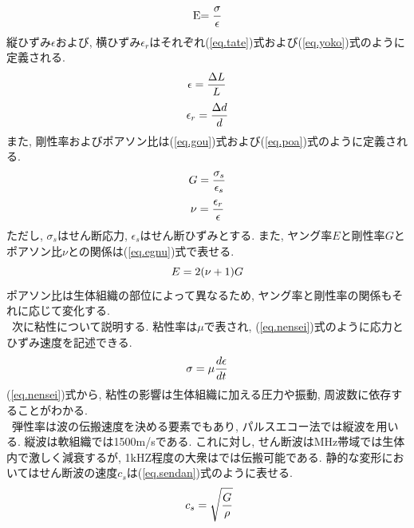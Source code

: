 \begin{itemize}
\begin{equation}
\label{eq.young}
\\$E$ =  \dfrac{\sigma}{\epsilon}
\end{equation}
縦ひずみ$\epsilon$および, 横ひずみ$\epsilon_r$はそれぞれ(\ref{eq.tate})式および(\ref{eq.yoko})式のように定義される. 
\begin{equation}
\label{eq.tate}
\\\epsilon =  \dfrac{\Delta L}{L}
\end{equation}
\begin{equation}
\label{eq.yoko}
\\\epsilon_r =  \dfrac{\Delta d}{d}
\end{equation}
また, 剛性率およびポアソン比は(\ref{eq.gou})式および(\ref{eq.poa})式のように定義される. 
\begin{equation}
\label{eq.gou}
\\G =  \dfrac{\sigma_s}{\epsilon_s}
\end{equation}
\begin{equation}
\label{eq.poa}
\\\nu =  \dfrac{\epsilon_r}{\epsilon}
\end{equation}
ただし, $\sigma_s$はせん断応力, $\epsilon_s$はせん断ひずみとする. また, ヤング率$E$と剛性率$G$とポアソン比$\nu$との関係は(\ref{eq.egnu})式で表せる. 
\begin{equation}
\label{eq.egnu}
\\E=  2(\nu + 1)G
\end{equation}
ポアソン比は生体組織の部位によって異なるため, ヤング率と剛性率の関係もそれに応じて変化する. 
\\\ 次に粘性について説明する. 粘性率は$\mu$で表され, (\ref{eq.nensei})式のように応力とひずみ速度を記述できる. 
\begin{equation}
\label{eq.nensei}
\\\sigma =  \mu \dfrac{d \epsilon}{dt}
\end{equation}
(\ref{eq.nensei})式から, 粘性の影響は生体組織に加える圧力や振動, 周波数に依存することがわかる.
\\\ 弾性率は波の伝搬速度を決める要素でもあり, パルスエコー法では縦波を用いる. 縦波は軟組織では1500m/sである. これに対し, せん断波はMHz帯域では生体内で激しく減衰するが, 1kHZ程度の大衆はでは伝搬可能である. 静的な変形においてはせん断波の速度$c_s$は(\ref{eq.sendan})式のように表せる.
\begin{equation}
\label{eq.sendan}
\\\ c_s = \sqrt{\dfrac{G}{\rho}}
\end{equation}

\end{itemize}
